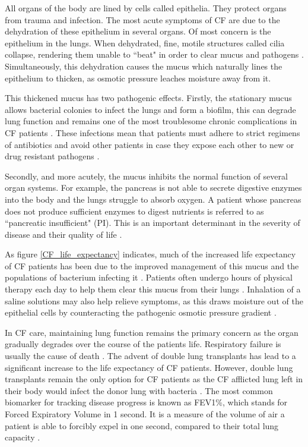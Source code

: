 All organs of the body are lined by cells called epithelia. They protect organs from trauma and infection. The most acute symptoms of CF are due to the dehydration of these epithelium in several organs. Of most concern is the epithelium in the lungs. When dehydrated, fine, motile structures called cilia collapse, rendering them unable to ``beat" in order to clear mucus and pathogens \cite{boucher2007, szczesniak2017}. Simultaneously, this dehydration causes the mucus which naturally lines the epithelium to thicken, as osmotic pressure leaches moisture away from it. 

This thickened mucus has two pathogenic effects. Firstly, the stationary mucus allows bacterial colonies to infect the lungs and form a biofilm, this can degrade lung function and remains one of the most troublesome chronic complications in CF patients \cite{chiappini2014}. These infections mean that patients must adhere to strict regimens of antibiotics and avoid other patients in case they expose each other to new or drug resistant pathogens \cite{conway2008}. 

Secondly, and more acutely, the mucus inhibits the normal function of several organ systems. For example, the pancreas is not able to secrete digestive enzymes into the body and the lungs struggle to absorb oxygen. A patient whose pancreas does not produce sufficient enzymes to digest nutrients is referred to as ``pancreatic insufficient" (PI). This is an important determinant in the severity of disease and their quality of life \cite{halloran2011,singh2017}.

As figure \ref{CF_life_expectancy} indicates, much of the increased life expectancy of CF patients has been due to the improved management of this mucus and the populations of bacterium infecting it \cite{mcbennett2022}. Patients often undergo hours of physical therapy each day to help them clear this mucus from their lungs \cite{chest_pt_CFF,thefreylife2015}. Inhalation of a saline solutions may also help relieve symptoms, as this draws moisture out of the epithelial cells by counteracting the pathogenic osmotic pressure gradient \cite{wark2018}. 

In CF care, maintaining lung function remains the primary concern as the organ gradually degrades over the course of the patients life. Respiratory failure is usually the cause of death \cite{kumar2018}. The advent of double lung transplants has lead to a significant increase to the life expectancy of CF patients. However, double lung transplants remain the only option for CF patients as the CF afflicted lung left in their body would infect the donor lung with bacteria \cite{mcbennett2022}. The most common biomarker for tracking disease progress is known as FEV1\%, which stands for Forced Expiratory Volume in 1 second. It is a measure of the volume of air a patient is able to forcibly expel in one second, compared to their total lung capacity \cite{szczesniak2017}. 

